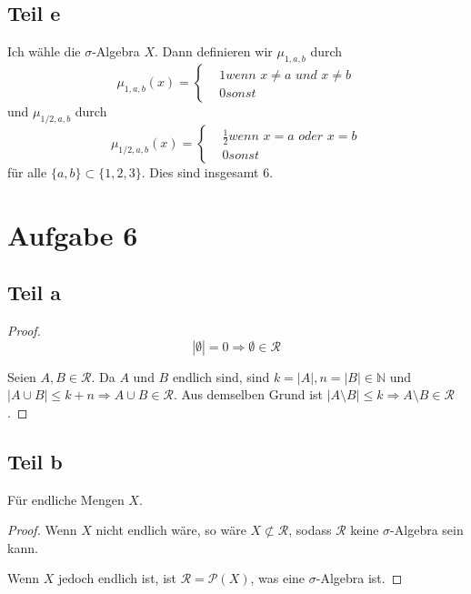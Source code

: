 \documentclass[10pt,a4paper]{article}
\begin{document}
\subsection{Teil e}
Ich wähle die $\sigma$-Algebra $X$.
Dann definieren wir $\mu_{1, a, b}$ durch
\begin{equation}
  \mu_{1, a, b}(x) = 
  \begin{cases}
    & 1 \textit{wenn $x \ne a$ und $x \ne b$}\\
    & 0 \textit{sonst}
  \end{cases}
\end{equation}
und $\mu_{1/2, a, b}$ durch
\begin{equation}
  \mu_{1/2, a, b}(x) =
  \begin{cases}
    & \frac{1}{2} \textit{wenn $x = a$ oder $x = b$}\\
    & 0 \textit{sonst}
  \end{cases}
\end{equation}
für alle $\{a, b\} \subset \{1, 2, 3\}$.
Dies sind insgesamt $6$.

\section{Aufgabe 6}

\subsection{Teil a}
\begin{proof}
  \begin{equation}
    |\emptyset| = 0 \Rightarrow \emptyset \in \mathscr{R}
  \end{equation}
  
  Seien $A, B \in \mathscr{R}$.
  Da $A$ und $B$ endlich sind, sind $k = |A|, n = |B| \in \mathbb{N}$ und $|A \cup B| \le k + n \Rightarrow A \cup B \in \mathscr{R}$.
  Aus demselben Grund ist $|A \setminus B| \le k \Rightarrow A \setminus B \in \mathscr{R}$.
\end{proof}

\subsection{Teil b}
Für endliche Mengen $X$.
\begin{proof}
  Wenn $X$ nicht endlich wäre, so wäre $X \not\subset \mathscr{R}$, sodass $\mathscr{R}$ keine $\sigma$-Algebra sein kann.
  
  Wenn $X$ jedoch endlich ist, ist $\mathscr{R} = \mathscr{P}(X)$, was eine $\sigma$-Algebra ist.
\end{proof}
\end{document}
